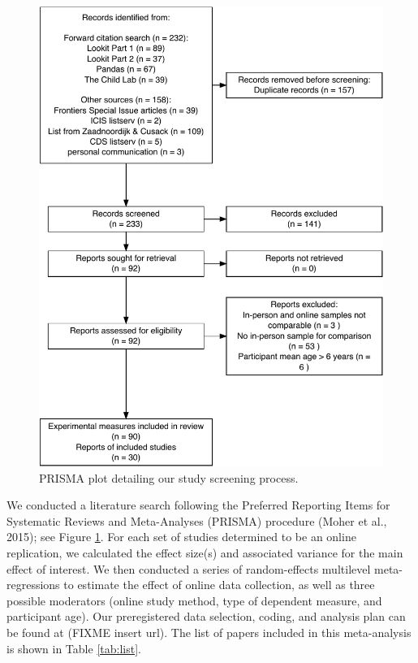 \documentclass[
  man,floatsintext]{apa6}
\begin{document}
\begin{figure}
\centering
\includegraphics{OnlineMA_main_files/figure-latex/prisma-1.pdf}
\caption{\label{fig:prisma}PRISMA plot detailing our study screening process.}
\end{figure}

We conducted a literature search following the Preferred Reporting Items for Systematic Reviews and Meta-Analyses (PRISMA) procedure (Moher et al., 2015); see Figure \ref{fig:prisma}. For each set of studies determined to be an online replication, we calculated the effect size(s) and associated variance for the main effect of interest. We then conducted a series of random-effects multilevel meta-regressions to estimate the effect of online data collection, as well as three possible moderators (online study method, type of dependent measure, and participant age). Our preregistered data selection, coding, and analysis plan can be found at (FIXME insert url). The list of papers included in this meta-analysis is shown in Table \ref{tab:list}.
\end{document}
